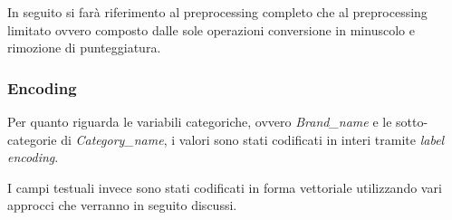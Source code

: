 In seguito si farà riferimento al preprocessing completo che al preprocessing
limitato ovvero composto dalle sole operazioni conversione in minuscolo e
rimozione di punteggiatura.

\subsubsection{Encoding}

Per quanto riguarda le variabili categoriche, ovvero \textit{Brand\_name} e le
sotto-categorie di \textit{Category\_name},
i valori sono stati codificati in interi tramite \textit{label encoding}.

I campi testuali invece sono stati codificati in forma vettoriale utilizzando
vari approcci che verranno in seguito discussi.


